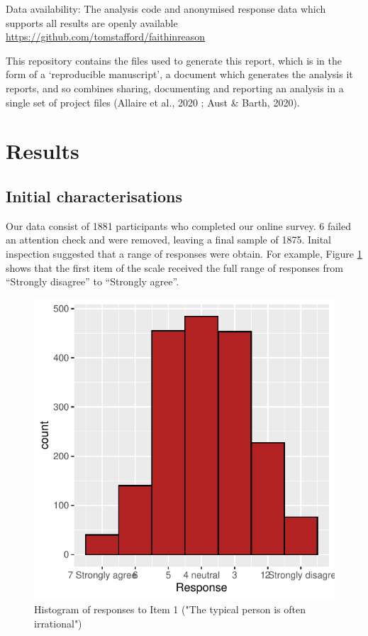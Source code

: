 \documentclass[
  ,jou,floatsintext]{apa6}
\begin{document}
Data availability: The analysis code and anonymised response data which supports all results are openly available \url{https://github.com/tomstafford/faithinreason}

This repository contains the files used to generate this report, which is in the form of a `reproducible manuscript', a document which generates the analysis it reports, and so combines sharing, documenting and reporting an analysis in a single set of project files (Allaire et al., 2020 ; Aust \& Barth, 2020).

\hypertarget{results}{%
\section{Results}\label{results}}

\hypertarget{initial-characterisations}{%
\subsection{Initial characterisations}\label{initial-characterisations}}

Our data consist of 1881 participants who completed our online survey. 6 failed an attention check and were removed, leaving a final sample of 1875. Inital inspection suggested that a range of responses were obtain. For example, Figure \ref{fig:Q19item1} shows that the first item of the scale received the full range of responses from ``Strongly disagree'' to ``Strongly agree''.

\begin{figure}

{\centering \includegraphics[width=0.75\linewidth]{faithinreason_files/figure-latex/Q19item1-1} 

}

\caption{Histogram of responses to Item 1 ("The typical person is often irrational")}\label{fig:Q19item1}
\end{figure}
\end{document}
